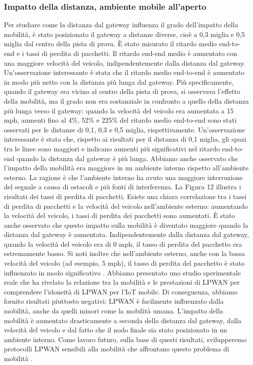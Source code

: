 \documentclass[a4paper]{report} %
\begin{document}
\subsubsection{Impatto della distanza, ambiente mobile all'aperto}
Per studiare come la distanza dal gateway influenza il grado dell'impatto della mobilità, è stato posizionato il gateway a distanze diverse, cioè a 0,3 miglia e 0,5 miglia dal centro della pista di prova. È stato misurato il ritardo medio end-to-end e i tassi di perdita di pacchetti. Il ritardo end-end medio è aumentato con una maggiore velocità del veicolo, indipendentemente dalla distanza dal gateway. Un'osservazione interessante è stata che il ritardo medio end-to-end è aumentato in modo più netto con la distanza più lunga dal gateway. Più specificamente, quando il gateway era vicino al centro della pista di prova, si osservava l'effetto della mobilità, ma il grado non era sostanziale in confronto a quello della distanza più lunga verso il gateway: quando la velocità del veicolo era aumentata a 15 mph, aumenti fino al 4\%, 52\% e 225\% del ritardo medio end-to-end sono stati osservati per le distanze di 0,1, 0,3 e 0,5 miglia, rispettivamente. Un'osservazione interessante è stata che, rispetto ai risultati per il distanza di 0,1 miglia, gli spazi tra le linee sono maggiori e indicano aumenti più significativi nel ritardo end-to-end quando la distanza dal gateway è più lunga. Abbiamo anche osservato che l'impatto della mobilità era maggiore in un ambiente interno rispetto all'ambiente esterno. La ragione è che l'ambiente interno ha avuto una maggiore interruzione del segnale a causa di ostacoli e più fonti di interferenza. La Figura 12 illustra i risultati dei tassi di perdita di pacchetti. Esiste una chiara correlazione tra i tassi di perdita di pacchetti e la velocità del veicolo nell'ambiente esterno: aumentando la velocità del veicolo, i tassi di perdita dei pacchetti sono aumentati. È stato anche osservato che questo impatto sulla mobilità è diventato maggiore quando la distanza dal gateway è aumentata. Indipendentemente dalla distanza dal gateway, quando la velocità del veicolo era di 0 mph, il tasso di perdita del pacchetto era estremamente basso. Si noti inoltre che nell'ambiente esterno, anche con la bassa velocità del veicolo (ad esempio, 5 mph), il tasso di perdita del pacchetto è stato influenzato in modo significativo \cite{art:rif.47}.
Abbiamo presentato uno studio sperimentale reale che ha rivelato la relazione tra la mobilità e le prestazioni di LPWAN per comprendere l'idoneità di LPWAN per l'IoT mobile. Di conseguenza, abbiamo fornito risultati piuttosto negativi: LPWAN è facilmente influenzato dalla mobilità, anche da quelli minori come la mobilità umana. L'impatto della mobilità è aumentato drasticamente a seconda della distanza dal gateway, dalla velocità del veicolo e dal fatto che il nodo finale sia stato posizionato in un ambiente interno. Come lavoro futuro, sulla base di questi risultati, svilupperemo protocolli LPWAN sensibili alla mobilità che affrontano questo problema di mobilità \cite{art:rif.47}.
\end{document}
